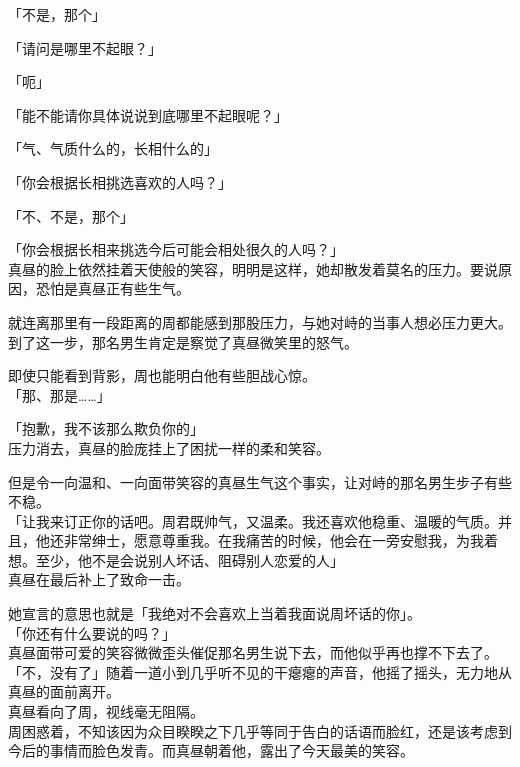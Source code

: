「不是，那个」

「请问是哪里不起眼？」

「呃」

「能不能请你具体说说到底哪里不起眼呢？」

「气、气质什么的，长相什么的」

「你会根据长相挑选喜欢的人吗？」

「不、不是，那个」

「你会根据长相来挑选今后可能会相处很久的人吗？」\\

真昼的脸上依然挂着天使般的笑容，明明是这样，她却散发着莫名的压力。要说原因，恐怕是真昼正有些生气。

就连离那里有一段距离的周都能感到那股压力，与她对峙的当事人想必压力更大。\\

到了这一步，那名男生肯定是察觉了真昼微笑里的怒气。

即使只能看到背影，周也能明白他有些胆战心惊。\\

「那、那是……」

「抱歉，我不该那么欺负你的」\\

压力消去，真昼的脸庞挂上了困扰一样的柔和笑容。

但是令一向温和、一向面带笑容的真昼生气这个事实，让对峙的那名男生步子有些不稳。\\

「让我来订正你的话吧。周君既帅气，又温柔。我还喜欢他稳重、温暖的气质。并且，他还非常绅士，愿意尊重我。在我痛苦的时候，他会在一旁安慰我，为我着想。至少，他不是会说别人坏话、阻碍别人恋爱的人」\\

真昼在最后补上了致命一击。

她宣言的意思也就是「我绝对不会喜欢上当着我面说周坏话的你」。\\

「你还有什么要说的吗？」\\

真昼面带可爱的笑容微微歪头催促那名男生说下去，而他似乎再也撑不下去了。「不，没有了」随着一道小到几乎听不见的干瘪瘪的声音，他摇了摇头，无力地从真昼的面前离开。\\

真昼看向了周，视线毫无阻隔。\\

周困惑着，不知该因为众目睽睽之下几乎等同于告白的话语而脸红，还是该考虑到今后的事情而脸色发青。而真昼朝着他，露出了今天最美的笑容。

